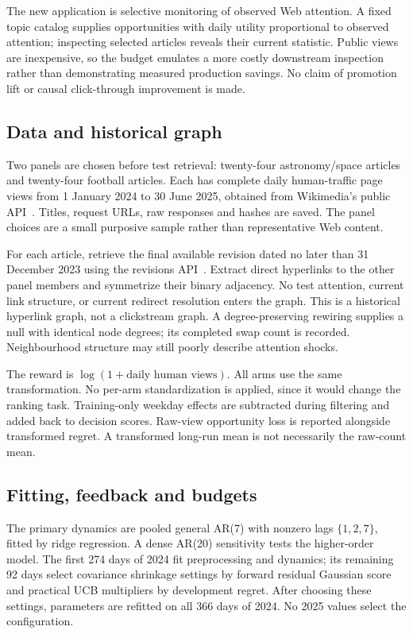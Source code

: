 The new application is selective monitoring of observed Web attention. A fixed topic catalog supplies opportunities with daily utility proportional to observed attention; inspecting selected articles reveals their current statistic. Public views are inexpensive, so the budget emulates a more costly downstream inspection rather than demonstrating measured production savings. No claim of promotion lift or causal click-through improvement is made.

\subsection{Data and historical graph}
Two panels are chosen before test retrieval: twenty-four astronomy/space articles and twenty-four football articles. Each has complete daily human-traffic page views from 1 January 2024 to 30 June 2025, obtained from Wikimedia's public API~\cite{wikiapi}. Titles, request URLs, raw responses and hashes are saved. The panel choices are a small purposive sample rather than representative Web content.

For each article, retrieve the final available revision dated no later than 31 December 2023 using the revisions API~\cite{wikihistory}. Extract direct hyperlinks to the other panel members and symmetrize their binary adjacency. No test attention, current link structure, or current redirect resolution enters the graph. This is a historical hyperlink graph, not a clickstream graph. A degree-preserving rewiring supplies a null with identical node degrees; its completed swap count is recorded. Neighbourhood structure may still poorly describe attention shocks.

The reward is $\log(1+\text{daily human views})$. All arms use the same transformation. No per-arm standardization is applied, since it would change the ranking task. Training-only weekday effects are subtracted during filtering and added back to decision scores. Raw-view opportunity loss is reported alongside transformed regret. A transformed long-run mean is not necessarily the raw-count mean.

\subsection{Fitting, feedback and budgets}
The primary dynamics are pooled general AR(7) with nonzero lags $\{1,2,7\}$, fitted by ridge regression. A dense AR(20) sensitivity tests the higher-order model. The first 274 days of 2024 fit preprocessing and dynamics; its remaining 92 days select covariance shrinkage settings by forward residual Gaussian score and practical UCB multipliers by development regret. After choosing these settings, parameters are refitted on all 366 days of 2024. No 2025 values select the configuration.

